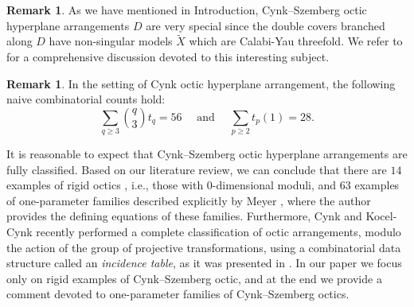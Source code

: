 \documentclass[11pt]{article}
\theoremstyle{plain}
\theoremstyle{definition}
\newtheorem{remark}[thm]{Remark}
\begin{document}
\begin{remark}
As we have mentioned in Introduction, Cynk--Szemberg octic hyperplane arrangements $D$ are very special since the double covers branched along $D$ have non-singular models $\widetilde{X}$ which are Calabi-Yau threefold. We refer to \cite{Cynks, Meyer} for a comprehensive discussion devoted to this interesting subject.
\end{remark}
\begin{remark}
In the setting of Cynk octic hyperplane arrangement, the following naive combinatorial counts hold:
\begin{equation}
\sum_{q\geq 3}\binom{q}{3}t_{q}  = 56 \quad \text{ and }  \quad \sum_{p\geq 2}t_{p}(1) = 28.
\end{equation}
\end{remark}
It is reasonable to expect that Cynk--Szemberg octic hyperplane arrangements are fully classified. Based on our literature review, we can conclude that there are $14$ examples of rigid octics \cite{Cynks}, i.e., those with $0$-dimensional moduli, and $63$ examples of one-parameter families described explicitly by Meyer \cite{Meyer}, where the author provides the defining equations of these families. Furthermore, Cynk and Kocel-Cynk recently performed a complete classification of octic arrangements, modulo the action of the group of projective transformations, using a combinatorial data structure called an \textit{incidence table}, as it was presented in \cite{Cynks}.
In our paper we focus only on rigid examples of Cynk--Szemberg octic, and at the end we provide a comment devoted to one-parameter families of Cynk--Szemberg octics.
\end{document}
